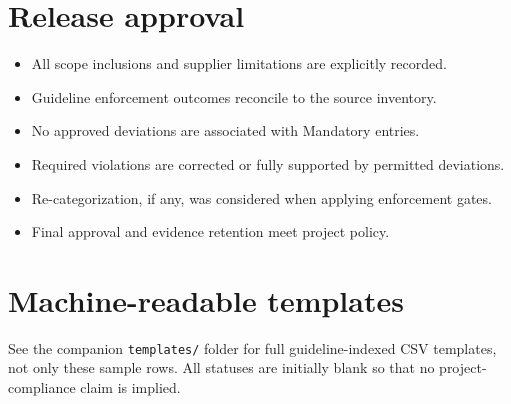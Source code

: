 \documentclass[10pt,letterpaper]{article}
\begin{document}
\section{Release approval}
\begin{itemize}
\item[$\square$] All scope inclusions and supplier limitations are explicitly recorded.
\item[$\square$] Guideline enforcement outcomes reconcile to the source inventory.
\item[$\square$] No approved deviations are associated with Mandatory entries.
\item[$\square$] Required violations are corrected or fully supported by permitted deviations.
\item[$\square$] Re-categorization, if any, was considered when applying enforcement gates.
\item[$\square$] Final approval and evidence retention meet project policy.
\end{itemize}
\section{Machine-readable templates}
See the companion \texttt{templates/} folder for full guideline-indexed CSV templates, not only these sample rows. All statuses are initially blank so that no project-compliance claim is implied.
\end{document}
